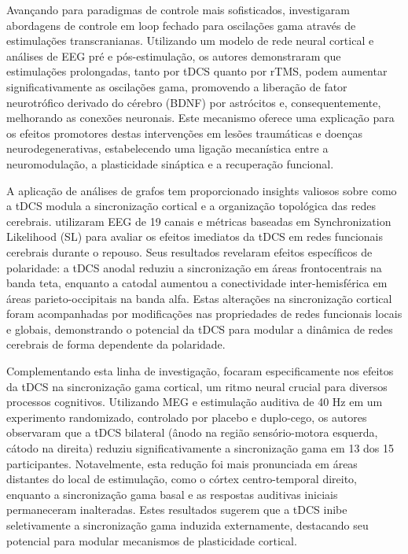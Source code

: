 Avançando para paradigmas de controle mais sofisticados,  investigaram abordagens de controle em loop fechado para oscilações gama através de estimulações transcranianas. Utilizando um modelo de rede neural cortical e análises de EEG pré e pós-estimulação, os autores demonstraram que estimulações prolongadas, tanto por tDCS quanto por rTMS, podem aumentar significativamente as oscilações gama, promovendo a liberação de fator neurotrófico derivado do cérebro (BDNF) por astrócitos e, consequentemente, melhorando as conexões neuronais. Este mecanismo oferece uma explicação para os efeitos promotores destas intervenções em lesões traumáticas e doenças neurodegenerativas, estabelecendo uma ligação mecanística entre a neuromodulação, a plasticidade sináptica e a recuperação funcional.

A aplicação de análises de grafos tem proporcionado insights valiosos sobre como a tDCS modula a sincronização cortical e a organização topológica das redes cerebrais.  utilizaram EEG de 19 canais e métricas baseadas em Synchronization Likelihood (SL) para avaliar os efeitos imediatos da tDCS em redes funcionais cerebrais durante o repouso. Seus resultados revelaram efeitos específicos de polaridade: a tDCS anodal reduziu a sincronização em áreas frontocentrais na banda teta, enquanto a catodal aumentou a conectividade inter-hemisférica em áreas parieto-occipitais na banda alfa. Estas alterações na sincronização cortical foram acompanhadas por modificações nas propriedades de redes funcionais locais e globais, demonstrando o potencial da tDCS para modular a dinâmica de redes cerebrais de forma dependente da polaridade.

Complementando esta linha de investigação,  focaram especificamente nos efeitos da tDCS na sincronização gama cortical, um ritmo neural crucial para diversos processos cognitivos. Utilizando MEG e estimulação auditiva de 40 Hz em um experimento randomizado, controlado por placebo e duplo-cego, os autores observaram que a tDCS bilateral (ânodo na região sensório-motora esquerda, cátodo na direita) reduziu significativamente a sincronização gama em 13 dos 15 participantes. Notavelmente, esta redução foi mais pronunciada em áreas distantes do local de estimulação, como o córtex centro-temporal direito, enquanto a sincronização gama basal e as respostas auditivas iniciais permaneceram inalteradas. Estes resultados sugerem que a tDCS inibe seletivamente a sincronização gama induzida externamente, destacando seu potencial para modular mecanismos de plasticidade cortical.

